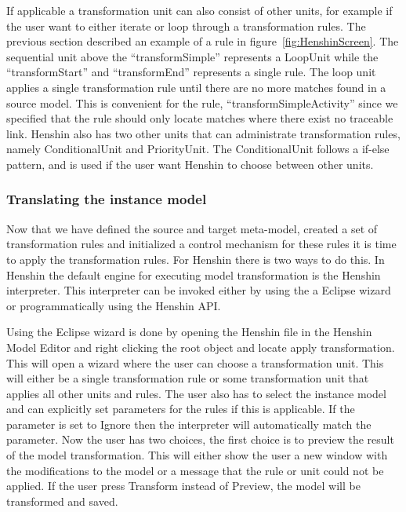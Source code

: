 If applicable a transformation unit can also consist of other units, for example
if the user want to either iterate or loop through a transformation rules. The
previous section described an example of a rule in
figure~\ref{fig:HenshinScreen}. The sequential unit above the
``transformSimple'' represents a LoopUnit while the ``transformStart'' and
``transformEnd'' represents a single rule. The loop unit applies a single
transformation rule until there are no more matches found in a source model.
This is convenient for the rule, ``transformSimpleActivity'' since we specified
that the rule should only locate matches where there exist no traceable link.
Henshin also has two other units that can administrate transformation rules,
namely ConditionalUnit and PriorityUnit. The ConditionalUnit follows a if-else
pattern, and is used if the user want Henshin to choose between other units.

\subsubsection*{Translating the instance model}

Now that we have defined the source and target meta-model, created a set of
transformation rules and initialized a control mechanism for these rules it is
time to apply the transformation rules. For Henshin there is two ways to do
this. In Henshin the default engine for executing model transformation is the
Henshin interpreter. This interpreter can be invoked either by using the a
Eclipse wizard or programmatically using the Henshin API. 

Using the Eclipse wizard is done by opening the Henshin file in the Henshin
Model Editor and right clicking the root object and locate apply transformation.
This will open a wizard where the user can choose a transformation unit. This
will either be a single transformation rule or some transformation unit that
applies all other units and rules. The user also has to select the instance
model and can explicitly set parameters for the rules if this is applicable. If
the parameter is set to Ignore then the interpreter will automatically match the
parameter. Now the user has two choices, the first choice is to preview the
result of the model transformation. This will either show the user a new window
with the modifications to the model or a message that the rule or unit could not
be applied. If the user press Transform instead of Preview, the model will be
transformed and saved.

